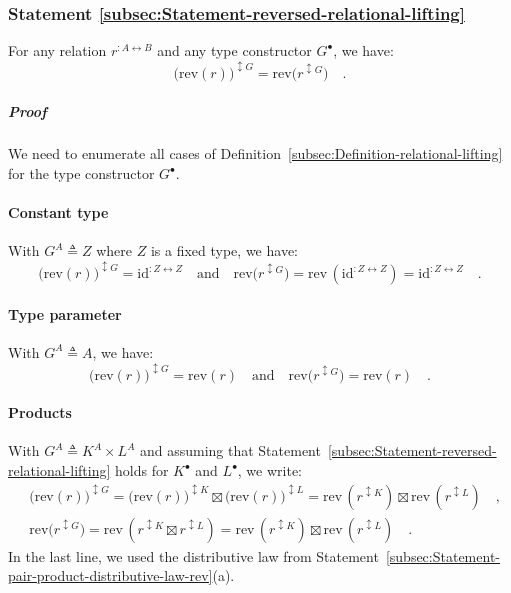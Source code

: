 \subsubsection{Statement \label{subsec:Statement-reversed-relational-lifting}\ref{subsec:Statement-reversed-relational-lifting}}

For any relation $r^{:A\leftrightarrow B}$ and any type constructor
$G^{\bullet}$, we have:
\[
\big(\text{rev}\left(r\right)\big)^{\updownarrow G}=\text{rev}\big(r^{\updownarrow G}\big)\quad.
\]


\subparagraph{Proof}

We need to enumerate all cases of Definition~\ref{subsec:Definition-relational-lifting}
for the type constructor $G^{\bullet}$.

\paragraph{Constant type}

With $G^{A}\triangleq Z$ where $Z$ is a fixed type, we have:
\[
\big(\text{rev}\left(r\right)\big)^{\updownarrow G}=\text{id}^{:Z\leftrightarrow Z}\quad\text{and}\quad\text{rev}\big(r^{\updownarrow G}\big)=\text{rev}\,(\text{id}^{:Z\leftrightarrow Z})=\text{id}^{:Z\leftrightarrow Z}\quad.
\]


\paragraph{Type parameter}

With $G^{A}\triangleq A$, we have:
\[
\big(\text{rev}\left(r\right)\big)^{\updownarrow G}=\text{rev}\left(r\right)\quad\text{and}\quad\text{rev}\big(r^{\updownarrow G}\big)=\text{rev}\left(r\right)\quad.
\]


\paragraph{Products}

With $G^{A}\triangleq K^{A}\times L^{A}$ and assuming that Statement~\ref{subsec:Statement-reversed-relational-lifting}
holds for $K^{\bullet}$ and $L^{\bullet}$, we write:
\begin{align*}
 & \big(\text{rev}\left(r\right)\big)^{\updownarrow G}=\big(\text{rev}\left(r\right)\big)^{\updownarrow K}\boxtimes\big(\text{rev}\left(r\right)\big)^{\updownarrow L}=\text{rev}\,(r^{\updownarrow K})\boxtimes\text{rev}\,(r^{\updownarrow L})\quad,\\
 & \text{rev}\big(r^{\updownarrow G}\big)=\text{rev}\,(r^{\updownarrow K}\boxtimes r^{\updownarrow L})=\text{rev}\,(r^{\updownarrow K})\boxtimes\text{rev}\,(r^{\updownarrow L})\quad.
\end{align*}
In the last line, we used the distributive law from Statement~\ref{subsec:Statement-pair-product-distributive-law-rev}(a).

